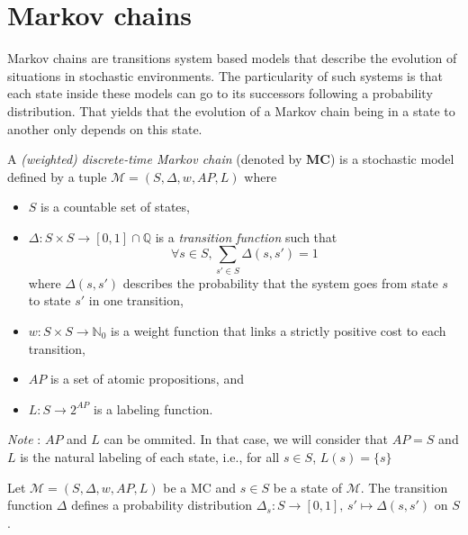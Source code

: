 \section{Markov chains}
Markov chains are transitions system based models that describe the evolution of situations in stochastic environments. The particularity of such systems is that each state inside these models can go to its successors following a probability distribution. That yields that the evolution of a Markov chain being in a state to another only depends on this state.
\begin{definition}
  A \textit{(weighted) discrete-time Markov chain} (denoted by \textbf{MC}) is a stochastic model defined by a tuple $\mathcal{M}=(S, \Delta, w, AP, L)$ where
	\begin{itemize}
		\item $S$ is a countable set of states,
		\item $\Delta: S \times S \rightarrow [0,1] \cap \mathbb{Q}$ is a  \textit{transition function} such that \[\forall s \in S, \sum_{s' \in S}\Delta(s, s')= 1\]
		where $\Delta(s, s')$ describes the probability that the system goes from state $s$ to state $s'$ in one transition,
    \item $w : S \times S \rightarrow \mathbb{N}_0$ %
      is a weight function that links a strictly positive cost to each transition,
    \item $AP$ is a set of atomic propositions, and
    \item $L : S \rightarrow 2^{AP}$ is a labeling function.
	\end{itemize}
  \textit{Note }: $AP$ and $L$ can be ommited. In that case, we will consider that $AP = S$ and $L$ is the natural labeling of each state, i.e., for all $s \in S$, $L(s) = \{s\}$
\end{definition}

\begin{property}
  Let $\mathcal{M} = (S, \Delta, w, AP, L)$ be a MC and $s \in S$ be a state of $\mathcal{M}$. The transition function $\Delta$ defines a probability distribution $\Delta_s : S \rightarrow [0, 1], \, s' \mapsto \Delta(s, s')$ on $S$.
\end{property}

